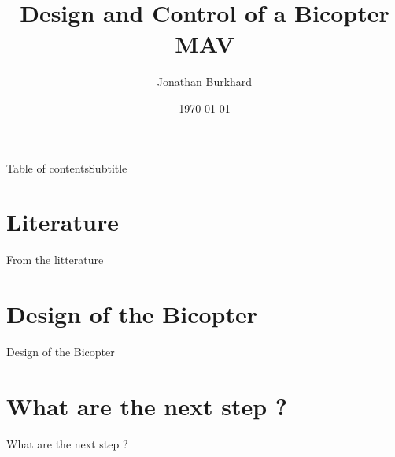 \documentclass{beamer}
\author{Jonathan Burkhard}
\title{Design and Control of a Bicopter MAV}
\date{\today}
\begin{document}
\frame{\maketitle}
\begin{frame}{Table of contents}{Subtitle}
	\tableofcontents
\end{frame}

\section{Literature}
\begin{frame}{From the litterature}

\end{frame}


\section{Design of the Bicopter}
\begin{frame}{Design of the Bicopter}

\end{frame}

\section{What are the next step ?}
\begin{frame}{What are the next step ?}

\end{frame}
\end{document}
